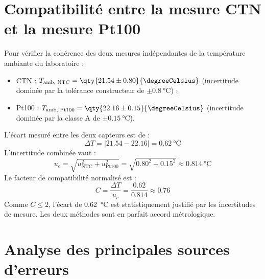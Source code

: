 \section{Compatibilité entre la mesure CTN et la mesure Pt100}
\label{sec:compatibilite}

Pour vérifier la cohérence des deux mesures indépendantes de la température ambiante du laboratoire :
\begin{itemize}[leftmargin=1.2cm]
    \item CTN : $T_{\text{amb, NTC}} = \qty{21.54 \pm 0.80}{\degreeCelsius}$ (incertitude dominée par la tolérance constructeur de $\pm \qty{0.8}{\degreeCelsius}$) ;
    \item Pt100 : $T_{\text{amb, Pt100}} = \qty{22.16 \pm 0.15}{\degreeCelsius}$ (incertitude dominée par la classe A de $\pm \qty{0.15}{\degreeCelsius}$).
\end{itemize}
L'écart mesuré entre les deux capteurs est de :
\begin{equation}
    \Delta T = |21.54 - 22.16| = \qty{0.62}{\degreeCelsius}
\end{equation}
L'incertitude combinée vaut :
\begin{equation}
    u_c = \sqrt{u_{\text{NTC}}^2 + u_{\text{Pt100}}^2} = \sqrt{0.80^2 + 0.15^2} \approx \qty{0.814}{\degreeCelsius}
\end{equation}
Le facteur de compatibilité normalisé est :
\begin{equation}
    C = \frac{\Delta T}{u_c} = \frac{0.62}{0.814} \approx \mathbf{0.76}
\end{equation}
Comme $C \le 2$, l'écart de \qty{0.62}{\degreeCelsius} est statistiquement justifié par les incertitudes de mesure. Les deux méthodes sont en parfait accord métrologique.

\section{Analyse des principales sources d'erreurs}
\label{sec:sources_erreurs}

